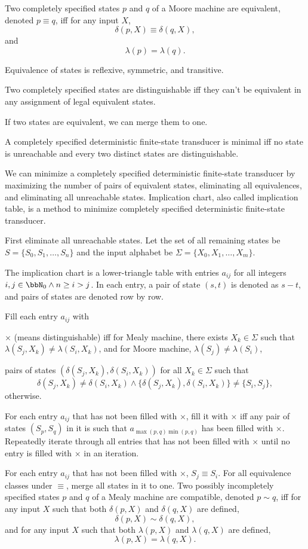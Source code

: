 \documentclass[a4paper,12pt]{report}
\begin{document}
Two completely specified states $p$ and $q$ of a Moore machine are equivalent, denoted $p\equiv q$, iff for any input $X$,
\[\delta(p,X)\equiv\delta(q,X),\]
and
\[\lambda(p)=\lambda(q).\]

Equivalence of states is reflexive, symmetric, and transitive.

Two completely specified states are distinguishable iff they can't be equivalent in any assignment of legal equivalent states.

If two states are equivalent, we can merge them to one.

A completely specified deterministic finite-state transducer is minimal iff no state is unreachable and every two distinct states are distinguishable.

We can minimize a completely specified deterministic finite-state transducer by maximizing the number of pairs of equivalent states, eliminating all equivalences, and eliminating all unreachable states.
Implication chart, also called implication table, is a method to minimize completely specified deterministic finite-state transducer.

First eliminate all unreachable states. Let the set of all remaining states be $S=\{S_0,S_1,\ldots,S_n\}$ and the input alphabet be $\Sigma=\{X_0,X_1,\ldots,X_m\}$.
\ben
\item The implication chart is a lower-triangle table with entries $a_{ij}$ for all integers $i,j\in\bbN_0\land n\geq i>j$. In each entry, a pair of state $(s,t)$ is denoted as $s-t$, and pairs of states are denoted row by row.
\item Fill each entry $a_{ij}$ with
\bit
\item $\times$ (means distinguishable) iff for Mealy machine, there exists $X_k\in\Sigma$ such that $\lambda(S_j,X_k)\neq\lambda(S_i,X_k)$, and for Moore machine, $\lambda(S_j)\neq\lambda(S_i)$,
\item pairs of states $(\delta(S_j,X_k),\delta(S_i,X_k))$ for all $X_k\in\Sigma$ such that
\[\delta(S_j,X_k)\neq\delta(S_i,X_k)\land\{\delta(S_j,X_k),\delta(S_i,X_k)\}\neq\{S_i,S_j\},\]
otherwise.
\eit
\item For each entry $a_{ij}$ that has not been filled with $\times$, fill it with $\times$ iff any pair of states $(S_p,S_q)$ in it is such that $a_{\max(p,q)\min(p,q)}$ has been filled with $\times$. Repeatedly iterate through all entries that has not been filled with $\times$ until no entry is filled with $\times$ in an iteration.
\item For each entry $a_{ij}$ that has not been filled with $\times$, $S_j\equiv S_i$. For all equivalence classes under $\equiv$, merge all states in it to one.
\een
{}
Two possibly incompletely specified states $p$ and $q$ of a Mealy machine are compatible, denoted $p\sim q$, iff for any input $X$ such that both $\delta(p,X)$ and $\delta(q,X)$ are defined,
\[\delta(p,X)\sim\delta(q,X),\]
and for any input $X$ such that both $\lambda(p,X)$ and $\lambda(q,X)$ are defined,
\[\lambda(p,X)=\lambda(q,X).\]
\end{document}

